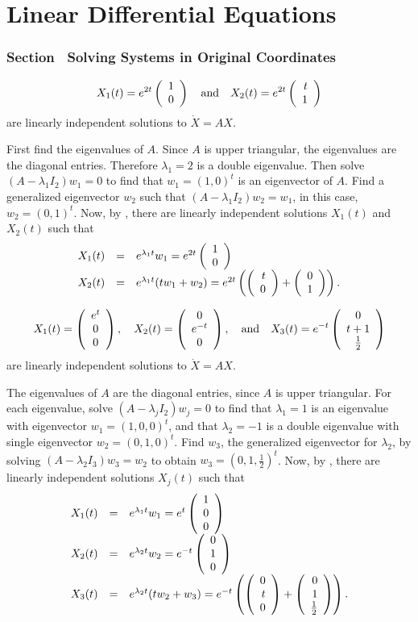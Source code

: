 \chapter{Linear Differential Equations}


\subsection*{Section~\protect{\ref{S:SEOC}} Solving Systems in Original Coordinates}


 \ans
\[
X_1(t) = e^{2t}\left(\begin{array}{r} 1 \\ 0\end{array}\right) \quad\mbox{and}\quad
X_2(t) = e^{2t}\left(\begin{array}{r} t \\ 1\end{array}\right)
\]
are linearly independent solutions to $\dot{X} = AX$.

\soln First find the eigenvalues of $A$.  Since $A$ is upper triangular,
the eigenvalues are the diagonal entries.  Therefore $\lambda_1 = 2$
is a double eigenvalue.  Then solve $(A - \lambda_1 I_2)w_1 = 0$ to
find that $w_1 = (1,0)^t$ is an eigenvector of $A$.  Find a
generalized eigenvector $w_2$ such that $(A - \lambda_1 I_2)w_2 =
w_1$, in this case, $w_2 = (0,1)^t$.  Now, by ,
there are linearly independent solutions $X_1(t)$ and $X_2(t)$ such that
\[
\begin{array}{rcl}
X_1(t) & = & e^{\lambda_1 t}w_1 = e^{2t}\left(\begin{array}{r} 1 \\ 0\end{array}\right) \\ X_2(t) & = &
e^{\lambda_1 t}(tw_1 + w_2) = e^{2t}\left(\left(\begin{array}{r} t \\ 0\end{array}\right) +
\left(\begin{array}{r} 0 \\ 1\end{array}\right)\right).
\end{array}
\]

 \ans
\[
X_1(t) = \left(\begin{array}{c} e^t \\ 0 \\ 0\end{array}\right), \quad
X_2(t) = \left(\begin{array}{c} 0 \\ e^{-t} \\ 0\end{array}\right), \quad\mbox{and}\quad
X_3(t) = e^{-t}\left(\begin{array}{c} 0 \\ t + 1 \\ \frac{1}{2}\end{array}\right)
\]
are linearly independent solutions to $\dot{X} = AX$.

\soln The eigenvalues of $A$ are the diagonal entries, since $A$ is upper
triangular.  For each eigenvalue, solve $(A - \lambda_j I_2)w_j = 0$
to find that $\lambda_1 = 1$ is an eigenvalue with eigenvector $w_1 =
(1,0,0)^t$, and that $\lambda_2 = -1$ is a double eigenvalue with
single eigenvector $w_2 = (0,1,0)^t$.  Find $w_3$, the generalized
eigenvector for $\lambda_2$, by solving $(A - \lambda_2 I_3)w_3 = w_2$
to obtain $w_3 = (0,1,\frac{1}{2})^t$.  Now, by ,
there are linearly independent solutions $X_j(t)$ such that
\[
\begin{array}{rcl}
X_1(t) & = & e^{\lambda_1 t}w_1 = e^t\left(\begin{array}{r} 1 \\ 0 \\ 0\end{array}\right) \\
X_2(t) & = & e^{\lambda_2 t}w_2 = e^{-t}\left(\begin{array}{r} 0 \\ 1 \\ 0\end{array}\right) \\
X_3(t) & = & e^{\lambda_2 t}(tw_2 + w_3) = e^{-t}\left(\left(\begin{array}{r} 0 \\ t \\ 0\end{array}\right)
+ \left(\begin{array}{r} 0 \\ 1 \\ \frac{1}{2}\end{array}\right)\right).
\end{array}
\]

